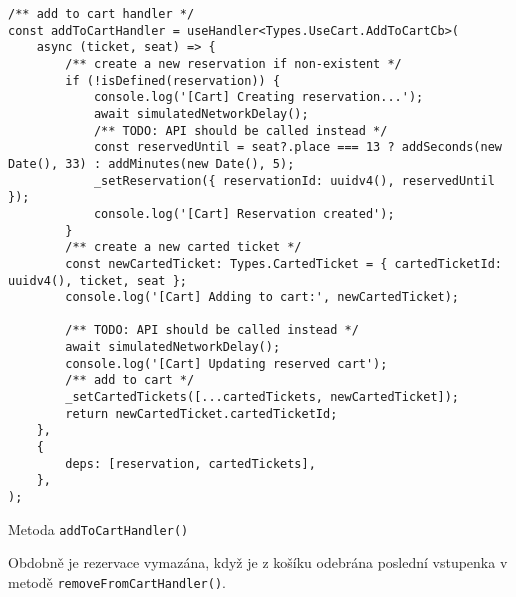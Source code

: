 \begin{listing}[H]
    \begin{verbatim}
/** add to cart handler */
const addToCartHandler = useHandler<Types.UseCart.AddToCartCb>(
	async (ticket, seat) => {
		/** create a new reservation if non-existent */
		if (!isDefined(reservation)) {
			console.log('[Cart] Creating reservation...');
			await simulatedNetworkDelay();
			/** TODO: API should be called instead */
			const reservedUntil = seat?.place === 13 ? addSeconds(new Date(), 33) : addMinutes(new Date(), 5);
			_setReservation({ reservationId: uuidv4(), reservedUntil });
			console.log('[Cart] Reservation created');
		}
		/** create a new carted ticket */
		const newCartedTicket: Types.CartedTicket = { cartedTicketId: uuidv4(), ticket, seat };
		console.log('[Cart] Adding to cart:', newCartedTicket);

		/** TODO: API should be called instead */
		await simulatedNetworkDelay();
		console.log('[Cart] Updating reserved cart');
		/** add to cart */
		_setCartedTickets([...cartedTickets, newCartedTicket]);
		return newCartedTicket.cartedTicketId;
	},
	{
		deps: [reservation, cartedTickets],
	},
);
    \end{verbatim}
    \caption{Metoda \texttt{addToCartHandler()}}
    \label{lst:add-to-cart-handler}
\end{listing}

Obdobně je rezervace vymazána, když je z košíku odebrána poslední vstupenka v metodě \texttt{removeFromCartHandler()}.


